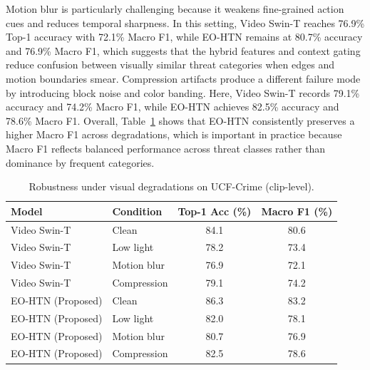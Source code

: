 \documentclass[AMA,Times1COL]{WileyNJDv5} %
\begin{document}
Motion blur is particularly challenging because it weakens fine-grained action cues and reduces temporal sharpness. In this setting, Video Swin-T reaches 76.9\% Top-1 accuracy with 72.1\% Macro F1, while EO-HTN remains at 80.7\% accuracy and 76.9\% Macro F1, which suggests that the hybrid features and context gating reduce confusion between visually similar threat categories when edges and motion boundaries smear. Compression artifacts produce a different failure mode by introducing block noise and color banding. Here, Video Swin-T records 79.1\% accuracy and 74.2\% Macro F1, while EO-HTN achieves 82.5\% accuracy and 78.6\% Macro F1. Overall, Table~\ref{tab:robustness_ucfcrime} shows that EO-HTN consistently preserves a higher Macro F1 across degradations, which is important in practice because Macro F1 reflects balanced performance across threat classes rather than dominance by frequent categories.

\begin{table}[t]
\centering
\caption{Robustness under visual degradations on UCF-Crime (clip-level).}
\label{tab:robustness_ucfcrime}
\renewcommand{\arraystretch}{1.1}
\setlength{\tabcolsep}{3.8pt}
\begin{tabular}{|p{3.6cm}|p{3.0cm}|c|c|}
\hline
\textbf{Model} & \textbf{Condition} & \textbf{Top-1 Acc (\%)} & \textbf{Macro F1 (\%)} \\
\hline
Video Swin-T & Clean & 84.1 & 80.6 \\
\hline
Video Swin-T & Low light & 78.2 & 73.4 \\
\hline
Video Swin-T & Motion blur & 76.9 & 72.1 \\
\hline
Video Swin-T & Compression & 79.1 & 74.2 \\
\hline
EO-HTN (Proposed) & Clean & 86.3 & 83.2 \\
\hline
EO-HTN (Proposed) & Low light & 82.0 & 78.1 \\
\hline
EO-HTN (Proposed) & Motion blur & 80.7 & 76.9 \\
\hline
EO-HTN (Proposed) & Compression & 82.5 & 78.6 \\
\hline
\end{tabular}%
\end{table}
\end{document}
